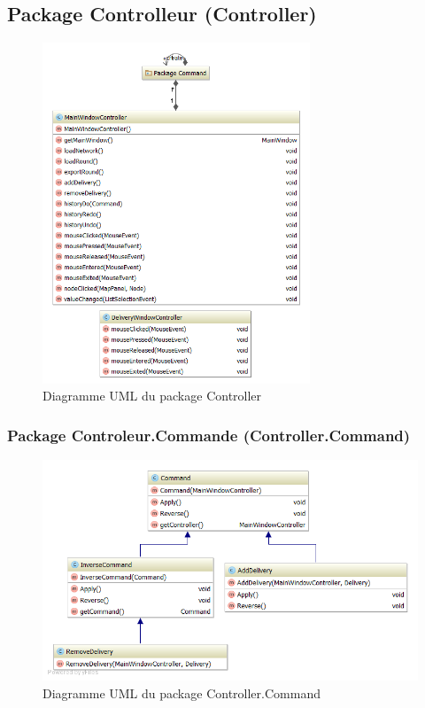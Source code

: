 \subsection{Package Controlleur (Controller)}

\begin{figure}[h]
    \centering
    \includegraphics[width=80mm]{../diagrams/classes_packages/classes_packages/controller/controller.png}
    \caption{Diagramme UML du package Controller}
    \label{diagram:uml_controller}
\end{figure}
\pagebreak

\subsubsection{Package Controleur.Commande (Controller.Command)}

\begin{figure}[h]
    \centering
    \includegraphics[width=160mm]{../diagrams/classes_packages/classes_packages/controller/package_command.png}
    \caption{Diagramme UML du package Controller.Command}
    \label{diagram:uml_controller_command}
\end{figure}

